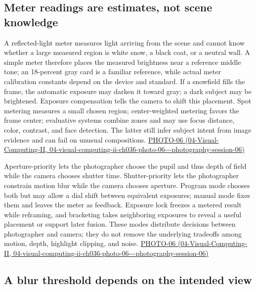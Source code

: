 \subsection{Meter readings are estimates, not scene knowledge}\label{03-visual-computing-i-ch003-meter-readings-are-estimates-not-scene-knowledge}

A reflected-light meter measures light arriving from the scene and cannot know whether a large measured region is white snow, a black coat, or a neutral wall. A simple meter therefore places the measured brightness near a reference middle tone; an 18-percent gray card is a familiar reference, while actual meter calibration constants depend on the device and standard. If a snowfield fills the frame, the automatic exposure may darken it toward gray; a dark subject may be brightened. Exposure compensation tells the camera to shift this placement. Spot metering measures a small chosen region; center-weighted metering favors the frame center; evaluative systems combine zones and may use focus distance, color, contrast, and face detection. The latter still infer subject intent from image evidence and can fail on unusual compositions. \href{../04-Visual-Computing-II/main.pdf\#nameddest=04-visual-computing-ii-ch036-photo-06---photography-session-06}{PHOTO-06 (04-Visual-Computing-II, 04-visual-computing-ii-ch036-photo-06-\/-\/-photography-session-06)}

Aperture-priority lets the photographer choose the pupil and thus depth of field while the camera chooses shutter time. Shutter-priority lets the photographer constrain motion blur while the camera chooses aperture. Program mode chooses both but may allow a dial shift between equivalent exposures; manual mode fixes them and leaves the meter as feedback. Exposure lock freezes a metered result while reframing, and bracketing takes neighboring exposures to reveal a useful placement or support later fusion. These modes distribute decisions between photographer and camera; they do not remove the underlying tradeoffs among motion, depth, highlight clipping, and noise. \href{../04-Visual-Computing-II/main.pdf\#nameddest=04-visual-computing-ii-ch036-photo-06---photography-session-06}{PHOTO-06 (04-Visual-Computing-II, 04-visual-computing-ii-ch036-photo-06-\/-\/-photography-session-06)}

\subsection{A blur threshold depends on the intended view}\label{03-visual-computing-i-ch003-a-blur-threshold-depends-on-the-intended-view}

